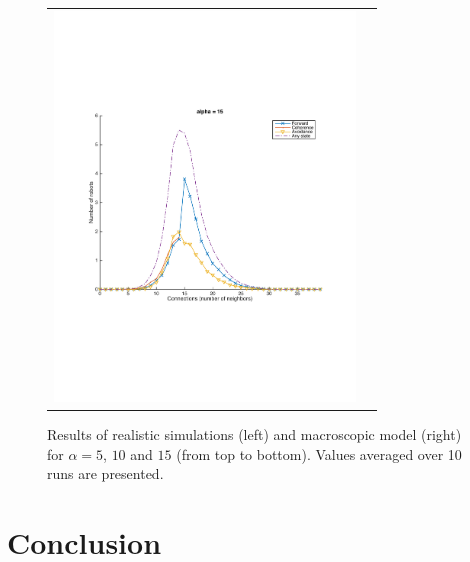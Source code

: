 \documentclass[a4paper, 10pt, conference]{ieeeconf}
\begin{document}
\begin{figure}[p]
\begin{center}
\begin{tabular}{lr}
        \includegraphics[width=8cm]{figures/macroscopic-40-alpha-15.pdf}
      \end{tabular}
      \caption{Results of realistic simulations (left) and macroscopic model (right) for $\alpha = 5$, $10$ and $15$ (from top to bottom). Values averaged over 10 runs are presented.}
      \label{fig:main-results}
    \end{center}
  \end{figure}


\section{Conclusion}



\end{document}
